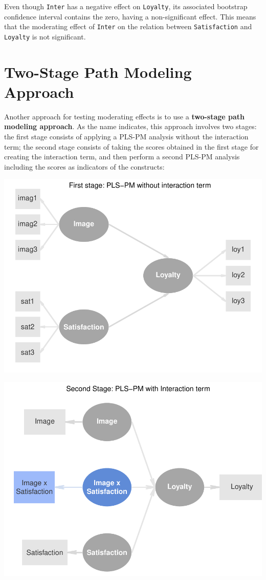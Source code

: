 \documentclass[12pt]{book}\usepackage{graphicx, color}
\newenvironment{knitrout}{}{} %
\begin{document}
Even though \texttt{Inter} has a negative effect on \texttt{Loyalty}, its associated bootstrap confidence interval contains the zero, having a non-significant effect. This means that the moderating effect of \texttt{Inter} on the relation between \texttt{Satisfaction} and \texttt{Loyalty} is not significant.




\section{Two-Stage Path Modeling Approach}
Another approach for testing moderating effects is to use a \textbf{two-stage path modeling approach}. As the name indicates, this approach involves two stages: the first stage consists of applying a PLS-PM analysis without the interaction term; the second stage consists of taking the scores obtained in the first stage for creating the interaction term, and then perform a second PLS-PM analysis including the scores as indicators of the constructs:



\begin{knitrout}
\color{fgcolor}

{\centering \includegraphics[width=.7\linewidth,height=.45\linewidth]{figure/TwoStageApp1_diag} 

}



\end{knitrout}






\begin{knitrout}
\color{fgcolor}

{\centering \includegraphics[width=.7\linewidth,height=.4\linewidth]{figure/TwoStageApp2_diag} 

}



\end{knitrout}
\end{document}
